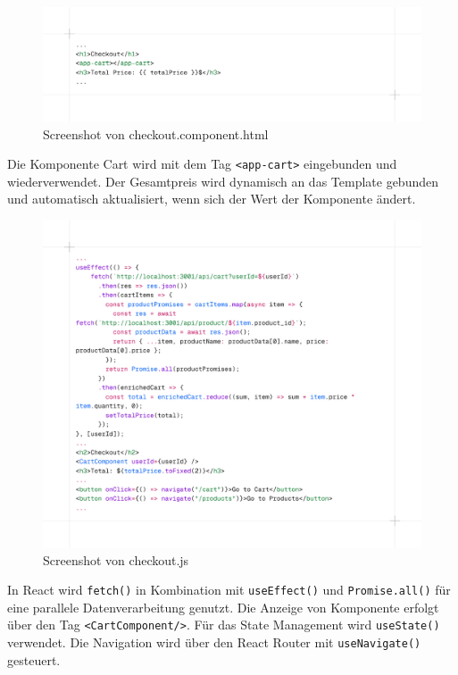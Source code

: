 \documentclass[oneside]{ausarbeitung}
\begin{document}
\begin{figure}[H]
    \centering
    \includegraphics[width=\linewidth]{images/acheckoutcomponenthtml.png}
    \caption{Screenshot von checkout.component.html}
    \label{fig:ahtmlcheckout}
\end{figure}

Die Komponente Cart wird mit dem Tag \texttt{<app-cart>} eingebunden und wiederverwendet. Der Gesamtpreis wird dynamisch an das Template gebunden und automatisch aktualisiert, wenn sich der Wert der Komponente ändert.

\begin{figure}[H]
    \centering
    \includegraphics[width=\linewidth]{images/rcheckout.png}
    \caption{Screenshot von checkout.js}
    \label{fig:rcheckout}
\end{figure}

In React wird \texttt{fetch()} in Kombination mit \texttt{useEffect()} und \texttt{Promise.all()} für eine parallele Datenverarbeitung genutzt. Die Anzeige von Komponente erfolgt über den Tag \texttt{<CartComponent/>}. Für das State Management wird \texttt{useState()} verwendet. Die Navigation wird über den React Router mit \texttt{useNavigate()} gesteuert.
\end{document}
